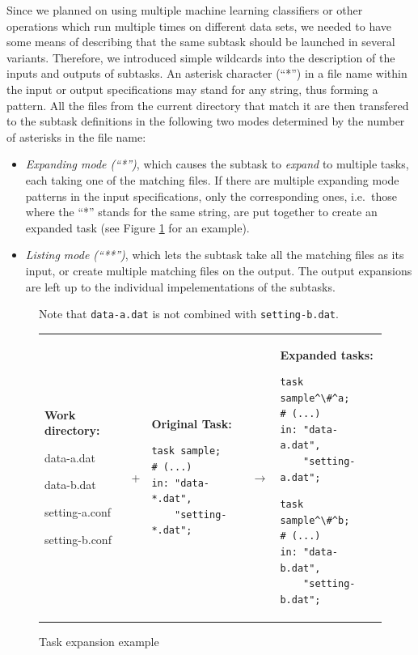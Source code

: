 \documentclass[12pt,notitlepage,a4paper]{report}
\begin{document}
Since we planned on using multiple machine learning classifiers or other operations which run multiple times on different data sets, we needed to have some means of describing that the same subtask should be launched in several variants. Therefore, we introduced simple wildcards into the description of the inputs and outputs of subtasks. An asterisk character (``*'') in a file name within the input or output specifications may stand for any string, thus forming a pattern. All the files from the current directory that match it are then transfered to the subtask definitions in the following two modes determined by the number of asterisks in the file name:
\begin{itemize}
    \item \emph{Expanding mode (``*'')}, which causes the subtask to \emph{expand} to multiple tasks, each taking one of the matching files. If there are multiple expanding mode patterns in the input specifications, only the corresponding ones, i.e.\ those where the ``*'' stands for the same string, are put together to create an expanded task (see Figure \ref{fig:expansion} for an example).
    \item \emph{Listing mode (``**'')}, which lets the subtask take all the matching files as its input, or create multiple matching files on the output. The output expansions are left up to the individual impelementations of the subtasks.
\end{itemize}

\begin{figure}
\caption{Task expansion example}\label{fig:expansion}\footnotesize
\begin{center}
Note that \texttt{data-a.dat} is not combined with \texttt{setting-b.dat}.

\begin{tabular}{m{3cm} c m{4.1cm} c m{4.1cm}}
\textbf{Work directory:}\par data-a.dat \par data-b.dat \par setting-a.conf \par setting-b.conf &
+ &
\textbf{Original Task:} \par \begin{lstlisting}
task sample;
# (...)
in: "data-*.dat",
    "setting-*.dat";\end{lstlisting} &
$\rightarrow$ &
\textbf{Expanded tasks:} \par \begin{lstlisting}
task sample^\#^a;
# (...)
in: "data-a.dat",
    "setting-a.dat";\end{lstlisting} \par \begin{lstlisting}
task sample^\#^b;
# (...)
in: "data-b.dat",
    "setting-b.dat";\end{lstlisting}
\end{tabular}
\end{center}
\end{figure}
\end{document}
